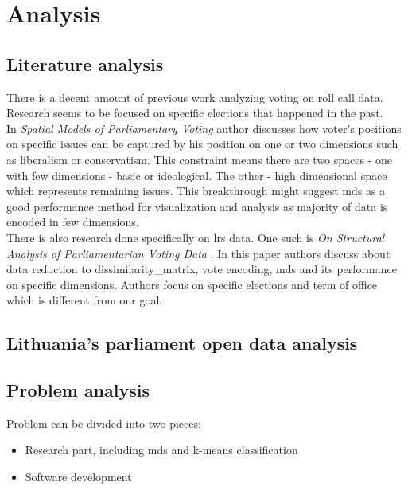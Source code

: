\documentclass[a4paper,12pt]{article}
\begin{document}
    
    \clearpage
    
    \section{Analysis}
   
   	\subsection{Literature analysis}
   	
	There is a decent amount of previous work analyzing voting on roll call data. Research seems to be focused on specific elections that happened in the past.\\	
	
	In \textit{Spatial Models of Parliamentary Voting} author discusses how voter's positions on specific issues can be captured by his position on one or two dimensions such as liberalism or conservatism. This constraint means there are two spaces - one with few dimensions - basic  or ideological. The other - high dimensional space which represents remaining issues. This breakthrough might suggest \acrlong{mds} as a good performance method for visualization and analysis as majority of data is encoded in few dimensions.\\
	
	
	There is also research done specifically on \gls{lrs} data. One such is \textit{On Structural Analysis of Parliamentarian Voting Data} \cite{DBLP:journals/informaticaLT/KrilaviciusZ08}. In this paper authors discuss about data reduction to \gls{dissimilarity_matrix}, vote encoding, \gls{mds} and its performance on specific dimensions. Authors focus on specific elections and term of office which is different from our goal.
	
	    	
   	
 	\subsection{Lithuania's parliament open data analysis }
 	 
 	\subsection{Problem analysis}
 	
 	Problem can be divided into two pieces:
 	\begin{itemize}
 		\item Research part, including \gls{mds} and \gls{k-means} classification
 		\item Software development
 	\end{itemize}
 	
\end{document}
